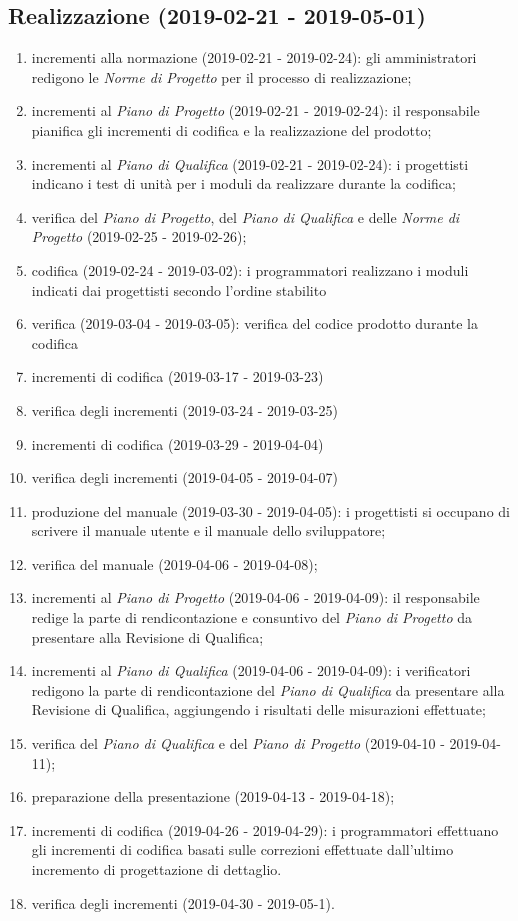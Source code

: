 	\subsection{Realizzazione (2019-02-21 - 2019-05-01)}
		\begin{enumerate}[label= 4.\arabic*)]
			\item incrementi alla normazione (2019-02-21 - 2019-02-24): gli amministratori redigono le \textit{Norme di Progetto} per il processo di realizzazione;
			\item incrementi al \textit{Piano di Progetto} (2019-02-21 - 2019-02-24): il responsabile pianifica gli incrementi di codifica e la realizzazione del prodotto;
			\item incrementi al \textit{Piano di Qualifica} (2019-02-21 - 2019-02-24): i progettisti indicano i test di unità per i moduli da realizzare durante la codifica;
			\item verifica del \textit{Piano di Progetto}, del \textit{Piano di Qualifica} e delle \textit{Norme di Progetto} (2019-02-25 - 2019-02-26);
			\item codifica (2019-02-24 - 2019-03-02): i programmatori realizzano i moduli indicati dai progettisti secondo l'ordine stabilito
			\item verifica (2019-03-04 - 2019-03-05): verifica del codice prodotto durante la codifica
			\item incrementi di codifica (2019-03-17 - 2019-03-23)
			\item verifica degli incrementi (2019-03-24 - 2019-03-25)
			\item incrementi di codifica (2019-03-29 - 2019-04-04)
			\item verifica degli incrementi (2019-04-05 - 2019-04-07)
			\item produzione del manuale (2019-03-30 - 2019-04-05): i progettisti si occupano di scrivere il manuale utente e il manuale dello sviluppatore;
			\item verifica del manuale (2019-04-06 - 2019-04-08);
			\item incrementi al \textit{Piano di Progetto} (2019-04-06 - 2019-04-09): il responsabile redige la parte di rendicontazione e consuntivo del \textit{Piano di Progetto} da presentare alla Revisione di Qualifica;
			\item incrementi al \textit{Piano di Qualifica} (2019-04-06 - 2019-04-09): i verificatori redigono la parte di rendicontazione del \textit{Piano di Qualifica} da presentare alla Revisione di Qualifica, aggiungendo i risultati delle misurazioni effettuate;
			\item verifica del \textit{Piano di Qualifica} e del \textit{Piano di Progetto} (2019-04-10 - 2019-04-11);
			\item preparazione della presentazione (2019-04-13 - 2019-04-18);
			\item incrementi di codifica (2019-04-26 - 2019-04-29): i programmatori effettuano gli incrementi di codifica basati sulle correzioni effettuate dall'ultimo incremento di progettazione di dettaglio.
			\item verifica degli incrementi (2019-04-30 - 2019-05-1).
		\end{enumerate}
		
